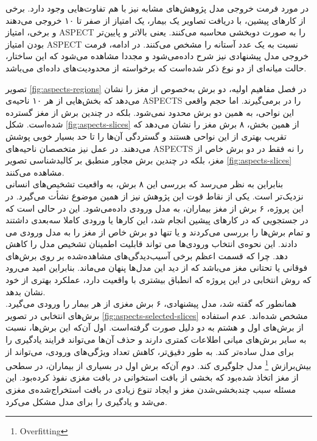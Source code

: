 در مورد فرمت خروجی مدل پژوهش‌های مشابه نیز با هم تفاوت‌هایی وجود دارد.
برخی از کارهای پیشین، با دریافت تصاویر یک بیمار، یک امتیاز از صفر تا ۱۰ خروجی می‌دهند و برخی، امتیاز ASPECT را به صورت دوبخشی محاسبه می‌کنند.
یعنی بالاتر و پایین‌تر بودن امتیاز ASPECT نسبت به یک عدد آستانه را مشخص می‌کنند.
در ادامه، فرمت خروجی مدل پیشنهادی نیز شرح داده‌می‌شود و
مجددا مشاهده می‌شود که این ساختار، حالت میانه‌ای از دو نوع ذکر شده‌است که برخواسته از محدودیت‌های داده‌ای می‌باشد.


تصویر \ref{fig:aspects-regions}
در فصل مفاهیم اولیه، دو برش به‌خصوص از مغز را نشان می‌دهد که بخش‌هایی از هر ۱۰ ناحیه‌ی ASPECTS را در برمی‌گیرند.
اما حجم واقعی این نواحی، به همین دو برش محدود نمی‌شود.
بلکه در چندین برش از مغز گسترده شده‌است.
شکل \ref{fig:aspects-slices}
از همین بخش، ۸ برش مغز را نشان می‌دهد که تقریب بهتری از این نواحی هستند و گستردگی آن‌ها را تا حد بسیار خوبی پوشش می‌دهند.
در عمل نیز متخصصان
ناحیه‌های ASPECTS را 
 نه فقط در دو برش خاص از مغز، بلکه 
 در چندین برش مجاور منطبق بر کالبدشناسی تصویر 
 \ref{fig:aspects-slices}
 مشاهده می‌کنند.\\

 بنابراین به نظر می‌رسد که بررسی این ۸ برش، به واقعیت تشخیص‌های انسانی نزدیک‌تر است.
 یکی از نقاط قوت این پژوهش نیز از همین موضوع نشأت می‌گیرد.
 در این پروژه، ۶ برش از مغز بیماران، به مدل ورودی داده‌می‌شود.
این در حالی است که در جستجویی که در کارهای پیشین
انجام شد، این کارها یا ورودی کاملا سه‌بعدی داشتند و تمام برش‌ها را بررسی می‌کردند و یا تنها دو برش خاص از مغز را به مدل ورودی می دادند.
این نحوه‌ی انتخاب ورودی‌ها می تواند قابلیت اطمینان تشخیص مدل را کاهش دهد.
چرا که قسمت اعظم برخی آسیب‌دیدگی‌های مشاهده‌شده
بر روی برش‌های فوقانی یا تحتانی مغز می‌باشد که از دید این مدل‌ها پنهان می‌ماند.
بنابراین امید می‌رود که روش انتخابی در این پروژه که انطباق بیشتری با واقعیت دارد، عملکرد بهتری از خود نشان بدهد.\\

همانطور که گفته شد، مدل پیشنهادی، ۶ برش مغزی از هر بیمار را ورودی می‌گیرد.
 برش‌های انتخابی در تصویر \ref{fig:aspects-selected-slices} مشخص شده‌اند.
 عدم استفاده از برش‌های اول و هشتم 
به دو دلیل صورت گرفته‌است.
اول آن‌که این برش‌ها، نسبت به سایر برش‌های میانی اطلاعات کمتری دارند و حذف آن‌ها می‌تواند فرایند یادگیری را برای مدل ساده‌تر کند.
به طور دقیق‌تر، کاهش تعداد ویژگی‌های ورودی، می‌تواند از بیش‌برازش
\footnote{Overfitting}
مدل جلوگیری کند.
دوم آن‌که برش اول در بسیاری از بیماران، در سطحی از مغز اتخاذ شده‌بود که 
بخشی از بافت استخوانی در بافت مغزی نفوذ کرده‌بود.
این مسئله سبب چند‌بخشی‌شدن مغز و ایجاد تنوع زیادی در بافت استخراج‌شده‌ی مغزی می‌شد و یادگیری را برای مدل مشکل می‌کرد.\\


